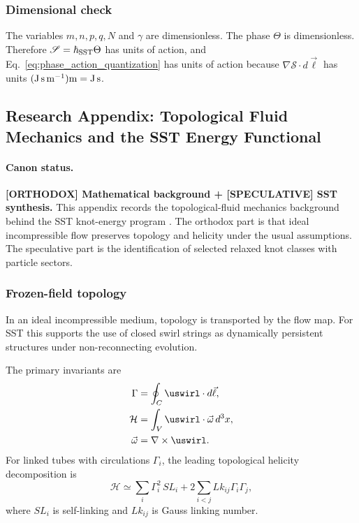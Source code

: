 \subsubsection{Dimensional check}
The variables $m,n,p,q,N$ and $\gamma$ are dimensionless. The phase $\Theta$ is dimensionless. Therefore $\mathscr S=\hbar_{\rm SST}\Theta$ has units of action, and Eq.~\eqref{eq:phase_action_quantization} has units of action because $\nabla\mathscr S\cdot d\vec\ell$ has units $({\rm J\,s\,m^{-1}}){\rm m}={\rm J\,s}$.

\subsection{Research Appendix: Topological Fluid Mechanics and the SST Energy Functional}
\label{app:tfm_energy_functional}

\paragraph{Canon status.}
\textbf{[ORTHODOX] Mathematical background + [SPECULATIVE] SST synthesis.}
This appendix records the topological-fluid mechanics background behind the SST knot-energy program \cite{Moffatt1969,Ricca1998KnotFluidMechanics}. The orthodox part is that ideal incompressible flow preserves topology and helicity under the usual assumptions. The speculative part is the identification of selected relaxed knot classes with particle sectors.

\subsubsection{Frozen-field topology}
In an ideal incompressible medium, topology is transported by the flow map. For SST this supports the use of closed swirl strings as dynamically persistent structures under non-reconnecting evolution.

The primary invariants are
\begin{align}
    \Gamma &= \oint_C \uswirl\cdot d\vec\ell,\label{eq:gamma_appendix}\\
    \mathcal H &= \int_V \uswirl\cdot\vec\omega\,d^3x,\label{eq:helicity_appendix}\\
    \vec\omega &= \nabla\times\uswirl.\label{eq:vorticity_appendix}
\end{align}
For linked tubes with circulations $\Gamma_i$, the leading topological helicity decomposition is
\begin{equation}
    \mathcal H
    \simeq
    \sum_i \Gamma_i^2\,SL_i
    +2\sum_{i<j}Lk_{ij}\Gamma_i\Gamma_j,
    \label{eq:helicity_link_decomposition}
\end{equation}
where $SL_i$ is self-linking and $Lk_{ij}$ is Gauss linking number.

